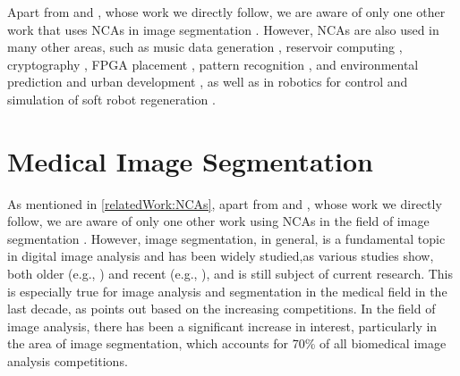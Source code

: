 Apart from \cite{kalkhof:2023:medNCA} and \cite{kalkhof:2023:M3D-NCA}, whose work we directly follow, we are aware of only one other work that uses NCAs in image segmentation \cite{sandler:2020:imageSegNCA}. However, NCAs are also used in many other areas, such as music data generation \cite{Delaroso:MusikNCA}, reservoir computing \cite{McDonald:ReservoirNCAs}, cryptography \cite{Abdo:KryptoNCA}, FPGA placement \cite{Lyke:FPGA-NCA}, pattern recognition \cite{Wali:2022:patternNCA}, and environmental prediction \cite{Aldabbagh:2022:DessertNCA} and urban development \cite{Cevendran:2019:CityNCA}, as well as in robotics for control \cite{variengien:2021:roboNCA} and simulation of soft robot regeneration \cite{Horibe:2021:softRoboNCA}.


\section{Medical Image Segmentation}
\label{relatedWork:medImageSegmentation}
As mentioned in \autoref{relatedWork:NCAs}, apart from \cite{kalkhof:2023:medNCA} and \cite{kalkhof:2023:M3D-NCA}, whose work we directly follow, we are aware of only one other work using NCAs in the field of image segmentation \cite{sandler:2020:imageSegNCA}. However, image segmentation, in general, is a fundamental topic in digital image analysis and has been widely studied,as various studies show, both older (e.g., \cite{Fu:1981:ImageSegmentation_survey}) and recent (e.g., \cite{Merchant:2023:ImageSegmentation_survey}), and is still subject of current research. This is especially true for image analysis and segmentation in the medical field in the last decade, as \cite{Maier-Hain:2018:BioMedAnalysisOverview/Ranking} points out based on the  increasing competitions. In the field of image analysis, there has been a significant increase in interest, particularly in the area of image segmentation, which accounts for 70\% of all biomedical image analysis competitions.


